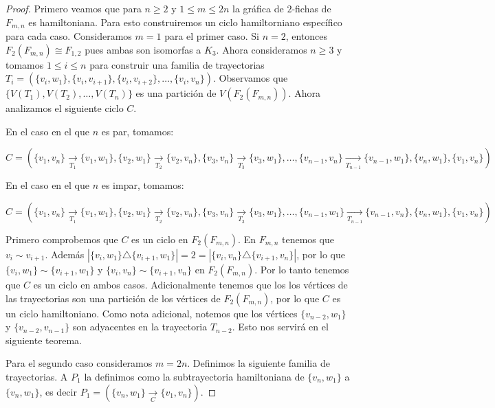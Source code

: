 \begin{proof}
    Primero veamos que para $n \geq 2$ y $1 \leq m \leq 2n$ la gr\'afica de
    $2$-fichas de $F_{m,n}$ es hamiltoniana. Para esto construiremos un ciclo
    hamiltorniano espec\'ifico para cada caso. Consideramos $m=1$ para el primer
    caso. Si $n=2$, entonces $F_2(F_{m,n}) \cong F_{1,2}$ pues ambas son
    isomorfas a $K_3$. Ahora consideramos $n \geq 3$ y tomamos $1 \leq i \leq n$
    para construir una familia de trayectorias
    $T_i=(\{v_i,w_1\},\{v_i,v_{i+1}\},\{v_i,v_{i+2}\},\dots, \{v_i,v_n\})$. Observamos
    que $\{V(T_1),V(T_2),\dots, V(T_n)\}$ es una partici\'on de
    $V(F_2(F_{m,n}))$. %
    Ahora analizamos el siguiente ciclo $C$.
    
    En el caso en el que $n$ es par, tomamos:

    $C=(\{v_1,v_n\} \xrightarrow[T_1]{}\{v_1,w_1\},\{v_2,w_1\}
    \xrightarrow[T_2]{}\{v_2,v_n\},\{v_3,v_n\} \xrightarrow[T_3]{}\{v_3,w_1\},
    \dots, \{v_{n-1},v_n\}
    \xrightarrow[T_{n-1}]{}\{v_{n-1},w_1\},\{v_n,w_1\},\{v_1,v_n\})$

    En el caso en el que $n$ es impar, tomamos:

    $C=(\{v_1,v_n\} \xrightarrow[T_1]{}\{v_1,w_1\},\{v_2,w_1\}
    \xrightarrow[T_2]{}\{v_2,v_n\},\{v_3,v_n\} \xrightarrow[T_3]{}\{v_3,w_1\},
    \dots, \{v_{n-1},w_1\}
    \xrightarrow[T_{n-1}]{}\{v_{n-1},v_n\},\{v_n,w_1\},\{v_1,v_n\})$

    Primero comprobemos que $C$ es un ciclo en $F_2(F_{m,n})$. En $F_{m,n}$
    tenemos que $v_i \sim v_{i+1}$. Adem\'as $|\{v_i,w_1\}\triangle
    \{v_{i+1},w_1\}|=2 =|\{v_i,v_n\}\triangle \{v_{i+1},v_n\}|$, por lo que
    $\{v_i,w_1\}\sim \{v_{i+1},w_1\}$ y $\{v_i,v_n\}\sim \{v_{i+1},v_n\}$ en
    $F_2(F_{m,n})$. Por lo tanto tenemos que $C$ es un ciclo en ambos casos.
    Adicionalmente tenemos que los los v\'ertices de las trayectorias son una
    partici\'on de los v\'ertices de $F_2(F_{m,n})$, por lo que $C$ es un ciclo
    hamiltoniano. Como nota adicional, notemos que los v\'ertices
    $\{v_{n-2},w_1\}$ y $\{v_{n-2},v_{n-1}\}$ son adyacentes en la trayectoria
    $T_{n-2}$. Esto nos servir\'a en el siguiente teorema.

    Para el segundo caso consideramos $m=2n$. Definimos la siguiente familia de
    trayectorias. A $P_1$ la definimos como la subtrayectoria hamiltoniana de
    $\{v_n,w_1\}$ a $\{v_n,w_1\}$, es decir $P_1= (\{v_n,w_1\}
    \xrightarrow[C]{}\{v_1,v_n\})$. 
    

\end{proof}
